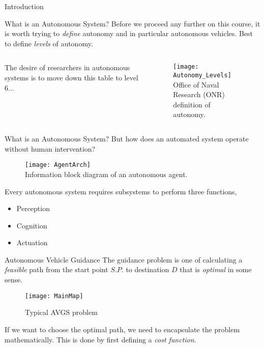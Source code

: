 \begin{frame}
\huge{Introduction}
\end{frame}

\begin{frame}{What is an Autonomous System?}
	Before we proceed any further on this course, it is worth trying to {\color{red}\textit{define}} autonomy and in particular autonomous vehicles. Best to define \textit{levels} of autonomy.
	\begin{columns}
		\begin{column}{0.2\linewidth}
			{\small The desire of researchers in autonomous systems is to move down this table to level 6...}
		\end{column}
		\begin{column}{0.7\linewidth}
			\begin{figure}
				\centering
				\texttt{[image: Autonomy\_Levels]}\\
				{\scriptsize Office of Naval Research (ONR) definition of autonomy.}
			\end{figure}
		\end{column}
	\end{columns}
	\vspace{10pt}
\end{frame}
	
\begin{frame}{What is an Autonomous System?}
	But how does an automated system operate without human intervention?
	\begin{figure}
		\centering
		\texttt{[image: AgentArch]}\\
		{\scriptsize Information block diagram of an autonomous agent.}
	\end{figure}
	Every autonomous system requires subsystems to perform three functions,
	\begin{itemize}
		\item Perception
		\item Cognition
		\item Actuation
	\end{itemize}
\vspace{10pt}
\end{frame}

\begin{frame}{Autonomous Vehicle Guidance}
	The guidance problem is one of calculating a {\color{red}\textit{feasible}} path from the start point $S.P.$ to destination $D$ that is {\color{red}\textit{optimal}} in some sense.
	\begin{figure}
	\centering
	\texttt{[image: MainMap]}
	\caption{Typical AVGS problem}
	\label{fig:MainMap}
	\end{figure}
	\vspace{-10pt}
	If we want to choose the optimal path, we need to encapsulate the problem mathematically. This is done by first defining a {\color{blue}\textit{cost function}}.	
\end{frame}

